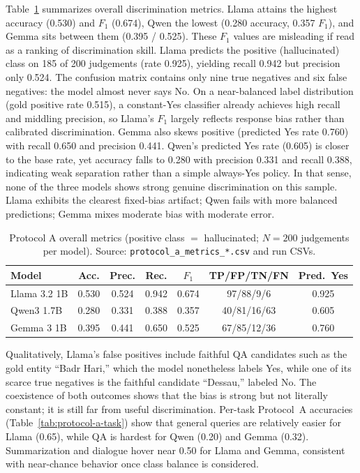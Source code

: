 \documentclass[11pt]{article}
\begin{document}
Table~\ref{tab:protocol-a} summarizes overall discrimination metrics. Llama
attains the highest accuracy (0.530) and $F_1$ (0.674), Qwen the lowest
(0.280 accuracy, 0.357 $F_1$), and Gemma sits between them (0.395 / 0.525).
These $F_1$ values are misleading if read as a ranking of discrimination skill.
Llama predicts the positive (hallucinated) class on 185 of 200 judgements (rate
0.925), yielding recall 0.942 but precision only 0.524. The confusion matrix
contains only nine true negatives and six false negatives: the model almost
never says No. On a near-balanced label distribution (gold positive rate
0.515), a constant-Yes classifier already achieves high recall and middling
precision, so Llama's $F_1$ largely reflects response bias rather than
calibrated discrimination. Gemma also skews positive (predicted Yes rate
0.760) with recall 0.650 and precision 0.441. Qwen's predicted Yes rate
(0.605) is closer to the base rate, yet accuracy falls to 0.280 with precision
0.331 and recall 0.388, indicating weak separation rather than a simple
always-Yes policy. In that sense, none of the three models shows strong genuine
discrimination on this sample. Llama exhibits the clearest fixed-bias artifact;
Qwen fails with more balanced predictions; Gemma mixes moderate bias with
moderate error.

\begin{table}[t]
\centering
\caption{Protocol A overall metrics (positive class $=$ hallucinated; $N=200$ judgements per model). Source: \texttt{protocol\_a\_metrics\_*.csv} and run CSVs.}
\label{tab:protocol-a}
\begin{tabular}{lcccccc}
\toprule
Model & Acc. & Prec. & Rec. & $F_1$ & TP/FP/TN/FN & Pred.\ Yes \\
\midrule
Llama 3.2 1B & 0.530 & 0.524 & 0.942 & 0.674 & 97/88/9/6 & 0.925 \\
Qwen3 1.7B & 0.280 & 0.331 & 0.388 & 0.357 & 40/81/16/63 & 0.605 \\
Gemma 3 1B & 0.395 & 0.441 & 0.650 & 0.525 & 67/85/12/36 & 0.760 \\
\bottomrule
\end{tabular}
\end{table}

Qualitatively, Llama's false positives include faithful QA candidates such as
the gold entity ``Badr Hari,'' which the model nonetheless labels Yes, while
one of its scarce true negatives is the faithful candidate ``Dessau,'' labeled
No. The coexistence of both outcomes shows that the bias is strong but not
literally constant; it is still far from useful discrimination. Per-task
Protocol~A accuracies (Table~\ref{tab:protocol-a-task}) show that general
queries are relatively easier for Llama (0.65), while QA is hardest for Qwen
(0.20) and Gemma (0.32). Summarization and dialogue hover near 0.50 for Llama
and Gemma, consistent with near-chance behavior once class balance is considered.
\end{document}
